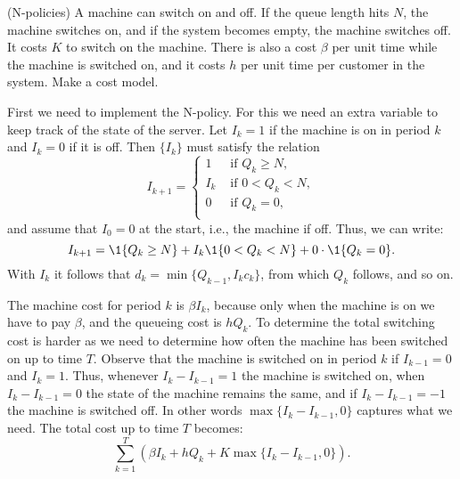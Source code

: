 \begin{question}(N-policies) A machine can switch on and off. If the
  queue length hits $N$, the machine switches on, and if the system
  becomes empty, the machine switches off. It costs $K$ to switch on
  the machine. There is also a cost $\beta$ per unit time while the
  machine is switched on, and it costs $h$ per unit time per customer
  in the system. Make a cost model. 
  \begin{solution}
    First we need to implement the N-policy. For this we need an extra
    variable to keep track of the state of the server. Let $I_k=1$ if the machine is on in period $k$ and $I_k=0$ if it is off. Then $\{I_k\}$ must satisfy the relation
    \begin{equation*}
      I_{k+1} =
      \begin{cases}
        1 & \text{ if } Q_{k} \geq N,\\
        I_k & \text{ if } 0< Q_{k} <N,\\
        0 & \text{ if }  Q_{k} =0,\\
      \end{cases}
    \end{equation*}
and assume that $I_0 =0$ at the start, i.e., the machine if off. Thus, we can write:
\begin{equation*}
  I_{k+1} = \1{Q_k\geq N} + I_k \1{0<Q_k<N} + 0\cdot \1{Q_k = 0}.
\end{equation*}
With $I_k$ it follows that $d_k =\min\{Q_{k-1}, I_k c_k\}$, from which
$Q_k$ follows, and so on.

The machine cost for period $k$ is $\beta I_k$, because only when the
machine is on we have to pay $\beta$, and the queueing cost is
$h Q_k$. To determine the total switching cost is harder as we need to
determine how often the machine has been switched on up to time
$T$. Observe that the machine is switched on in period $k$ if
$I_{k-1} = 0$ and $I_k=1$. Thus, whenever $I_k - I_{k-1}=1$ the
machine is switched on, when $I_k - I_{k-1}=0$ the state of the
machine remains the same, and if $I_k - I_{k-1} = -1$ the machine is
switched off. In other words $\max\{I_k - I_{k-1},0\}$ captures what
we need. The total cost up to time $T$ becomes:
\begin{equation*}
  \sum_{k=1}^T \left(\beta I_k + h Q_k + K\max\{I_k - I_{k-1}, 0\}\right).
\end{equation*}
  \end{solution}
\end{question}


